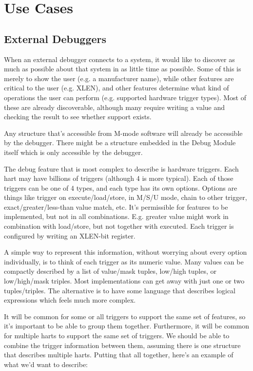 \section{Use Cases}

\subsection{External Debuggers}

When an external debugger connects to a system, it would like to discover as
much as possible about that system in as little time as possible. Some of this
is merely to show the user (e.g. a manufacturer name), while other features are
critical to the user (e.g. XLEN), and other features determine what kind of
operations the user can perform (e.g. supported hardware trigger types). Most
of these are already discoverable, although many require writing a value and
checking the result to see whether support exists.

Any structure that's accessible from M-mode software will already be
accessible by the debugger. There might be a structure embedded in the Debug
Module itself which is only accessible by the debugger.

The debug feature that is most complex to describe is hardware triggers. Each
hart may have billions of triggers (although 4 is more typical). Each of those
triggers can be one of 4 types, and each type has its own options. Options
are things like trigger on execute/load/store, in M/S/U mode, chain to other
trigger, exact/greater/less-than value match, etc. It's permissible for
features to be implemented, but not in all combinations. E.g. greater value
might work in combination with load/store, but not together with executed.
Each trigger is configured by writing an XLEN-bit register.

A simple way to represent this information, without worrying about every
option individually, is to think of each trigger as its numeric value. Many
values can be compactly described by a list of value/mask tuples, low/high
tuples, or low/high/mask triples. Most implementations can get away with just
one or two tuples/triples. The alternative is to have some language that
describes logical expressions which feels much more complex.

It will be common for some or all triggers to support the same set of
features, so it's important to be able to group them together. Furthermore,
it will be common for multiple harts to support the same set of triggers. We
should be able to combine the trigger information between them, assuming
there is one structure that describes multiple harts. Putting that all
together, here's an example of what we'd want to describe:

